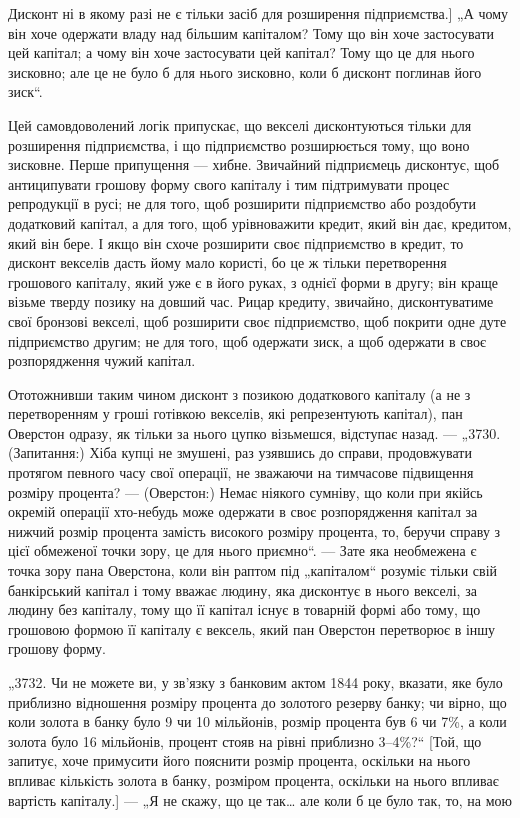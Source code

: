 \parcont{}  %
Дисконт ні в якому разі не є тільки засіб для розширення підприємства.] „А чому він хоче одержати
владу над більшим капіталом? Тому що він хоче застосувати цей капітал; а чому він
хоче застосувати цей капітал? Тому що це для нього зисковно;
але це не було б для нього зисковно, коли б дисконт поглинав
його зиск“.

Цей самовдоволений логік припускає, що векселі дисконтуються тільки для розширення підприємства, і
що підприємство
розширюється тому, що воно зисковне. Перше припущення — хибне. Звичайний підприємець дисконтує, щоб
антиципувати грошову форму свого капіталу і тим підтримувати процес репродукції в русі; не для того,
щоб розширити підприємство або роздобути додатковий капітал, а для того, щоб урівноважити кредит,
який він дає, кредитом, який він бере. І якщо він схоче
розширити своє підприємство в кредит, то дисконт векселів
дасть йому мало користі, бо це ж тільки перетворення грошового капіталу, який уже є в його руках, з
однієї форми
в другу; він краще візьме тверду позику на довший час.
Рицар кредиту, звичайно, дисконтуватиме свої бронзові векселі,
щоб розширити своє підприємство, щоб покрити одне дуте підприємство другим; не для того, щоб
одержати зиск, а щоб одержати в своє розпорядження чужий капітал.

Ототожнивши таким чином дисконт з позикою додаткового
капіталу (а не з перетворенням у гроші готівкою векселів, які
репрезентують капітал), пан Оверстон одразу, як тільки за нього
цупко візьмешся, відступає назад. — „3730. (Запитання:) Хіба
купці не змушені, раз узявшись до справи, продовжувати протягом певного часу свої операції, не
зважаючи на тимчасове
підвищення розміру процента? — (Оверстон:) Немає ніякого
сумніву, що коли при якійсь окремій операції хто-небудь може
одержати в своє розпорядження капітал за нижчий розмір
процента замість високого розміру процента, то, беручи справу
з цієї обмеженої точки зору, це для нього приємно“. — Зате
яка необмежена є точка зору пана Оверстона, коли він раптом
під „капіталом“ розуміє тільки свій банкірський капітал і тому
вважає людину, яка дисконтує в нього векселі, за людину без
капіталу, тому що її капітал існує в товарній формі або тому,
що грошовою формою її капіталу є вексель, який пан Оверстон
перетворює в іншу грошову форму.

„3732. Чи не можете ви, у зв’язку з банковим актом 1844 року,
вказати, яке було приблизно відношення розміру процента до
золотого резерву банку; чи вірно, що коли золота в банку було
9 чи 10 мільйонів, розмір процента був 6 чи 7\%, а коли золота
було 16 мільйонів, процент стояв на рівні приблизно 3--4\%?“
[Той, що запитує, хоче примусити його пояснити розмір процента, оскільки на нього впливає кількість
золота в банку, розміром процента, оскільки на нього впливає вартість капіталу.] —
„Я не скажу, що це так\dots{} але коли б це було так, то, на мою
\parbreak{}  %

